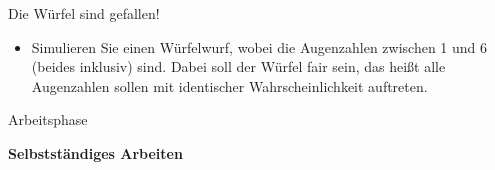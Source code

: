 \documentclass{../tuda-beamer}
\begin{document}
  \begin{frame}{Die Würfel sind gefallen!}
    \begin{itemize}
      \item Simulieren Sie einen Würfelwurf, wobei die Augenzahlen zwischen 1 und 6 (beides
      inklusiv) sind. Dabei soll der Würfel fair sein, das heißt alle Augenzahlen sollen mit
      identischer Wahrscheinlichkeit auftreten.
    \end{itemize}

    
  \end{frame}

  \begin{frame}[c]{Arbeitsphase}
    \begin{center}
      \textbf{\LARGE Selbstständiges Arbeiten}
    \end{center}
  \end{frame}
\end{document}

